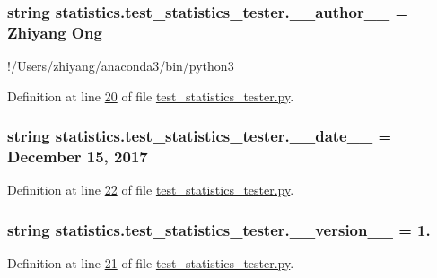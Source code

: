 \subsubsection[{\+\_\+\+\_\+author\+\_\+\+\_\+}]{\setlength{\rightskip}{0pt plus 5cm}string statistics.\+test\+\_\+statistics\+\_\+tester.\+\_\+\+\_\+author\+\_\+\+\_\+ = \textquotesingle{}Zhiyang Ong\textquotesingle{}}\label{namespacestatistics_1_1test__statistics__tester_ab9ecb1d5ecfb751c8b2a27ac138a0eed}


!/\+Users/zhiyang/anaconda3/bin/python3 



Definition at line \hyperlink{test__statistics__tester_8py_source_l00020}{20} of file \hyperlink{test__statistics__tester_8py_source}{test\+\_\+statistics\+\_\+tester.\+py}.

\hypertarget{namespacestatistics_1_1test__statistics__tester_a0d2103581aebe4f7dfb05775432fa386}{}
\subsubsection[{\+\_\+\+\_\+date\+\_\+\+\_\+}]{\setlength{\rightskip}{0pt plus 5cm}string statistics.\+test\+\_\+statistics\+\_\+tester.\+\_\+\+\_\+date\+\_\+\+\_\+ = \textquotesingle{}December 15, 2017\textquotesingle{}}\label{namespacestatistics_1_1test__statistics__tester_a0d2103581aebe4f7dfb05775432fa386}


Definition at line \hyperlink{test__statistics__tester_8py_source_l00022}{22} of file \hyperlink{test__statistics__tester_8py_source}{test\+\_\+statistics\+\_\+tester.\+py}.

\hypertarget{namespacestatistics_1_1test__statistics__tester_a29677162e8392e196da563156d924f5d}{}
\subsubsection[{\+\_\+\+\_\+version\+\_\+\+\_\+}]{\setlength{\rightskip}{0pt plus 5cm}string statistics.\+test\+\_\+statistics\+\_\+tester.\+\_\+\+\_\+version\+\_\+\+\_\+ = \textquotesingle{}1.\textquotesingle{}}\label{namespacestatistics_1_1test__statistics__tester_a29677162e8392e196da563156d924f5d}


Definition at line \hyperlink{test__statistics__tester_8py_source_l00021}{21} of file \hyperlink{test__statistics__tester_8py_source}{test\+\_\+statistics\+\_\+tester.\+py}.

